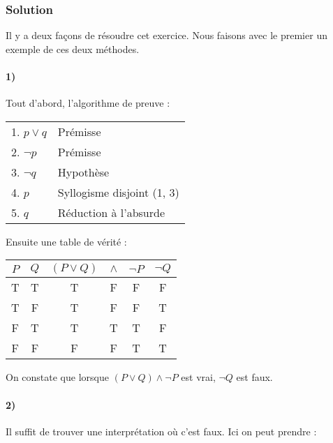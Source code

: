     \subsubsection*{Solution}
    Il y a deux façons de résoudre cet exercice.
    Nous faisons avec le premier un exemple de ces deux méthodes.

    \paragraph{1)}
    Tout d'abord, l'algorithme de preuve :

    \begin{center}
    \begin{tabular}{|l|l|}
    \hline
    1. $p \lor q$ & Prémisse \\
    2. $\lnot p$ & Prémisse \\
    \hspace{0.5cm} 3. $\lnot q$ & Hypothèse \\
    \hspace{0.5cm} 4. $p$ & Syllogisme disjoint (1, 3) \\ 
    5. $q$ & Réduction à l'absurde \\
    \hline
    \end{tabular}
    \end{center}

    Ensuite une table de vérité :

    \begin{center}
    	\begin{tabular}{cc|ccc|c}
    		$P$ & $Q$ & $(P \lor Q) $ & $\land$ & $\neg P$ & $\neg Q$ \\
    		\hline
    		T & T & T & F & F & F\\
    		T & F & T & F & F & T\\
    		F & T & T & \color{red}T & T & \color{red}F\\ 
    		F & F & F & F & T & T\\
    	\end{tabular}
    \end{center}
    
    On constate que lorsque $(P \lor Q) \land \neg P$ est vrai, $\neg Q$ est faux.
    
    \paragraph{2)}
    Il suffit de trouver une interprétation où c'est faux. Ici on peut prendre :
    
